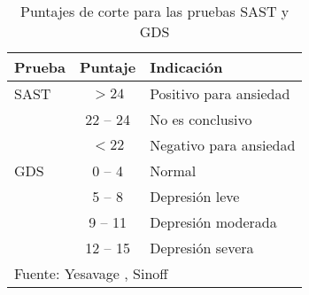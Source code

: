 \begin{table}
\centering
\caption{Puntajes de corte para las pruebas SAST y GDS}
\begin{tabular}{lcl}
\toprule
Prueba & Puntaje & Indicación \\
\midrule
SAST
& $>24$ & Positivo para ansiedad \\
& 22 -- 24 & No es conclusivo \\
& $<22$ & Negativo para ansiedad \\
\midrule
GDS
& 0 -- 4 & Normal \\
& 5 -- 8 & Depresión leve \\
& 9 -- 11 & Depresión moderada \\
& 12 -- 15 & Depresión severa \\
\bottomrule
\multicolumn{3}{l}{Fuente: Yesavage \cite{Yesavage82}, Sinoff \cite{sinoff99} }
\end{tabular}
\end{table}


